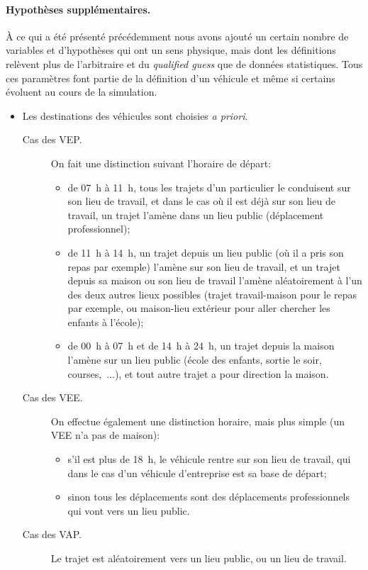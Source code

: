 		\paragraph{Hypothèses supplémentaires.} À ce qui a été présenté précédemment nous avons ajouté un certain nombre de variables et d'hypothèses qui ont un sens physique, mais dont les définitions relèvent plus de l'arbitraire et du \emph{qualified guess} que de données statistiques. Tous ces paramètres font partie de la définition d'un véhicule et même si certains évoluent au cours de la simulation.
		\begin{itemize}
			\item Les destinations des véhicules sont choisies \emph{a priori}. 
				\begin{description}
					\item[Cas des VEP.] On fait une distinction suivant l'horaire de départ:
					\begin{itemize}
    						\item de 07~h à 11~h, tous les trajets d'un particulier le conduisent sur son lieu de travail, et dans le cas où il est déjà sur son lieu de travail, un trajet l'amène dans un lieu public (déplacement professionnel);
    						\item de 11~h à 14~h, un trajet depuis un lieu public (où il a pris son repas par exemple) l'amène sur son lieu de travail, et un trajet depuis sa maison ou son lieu de travail l'amène aléatoirement à l'un des deux autres lieux possibles (trajet travail-maison pour le repas par exemple, ou maison-lieu extérieur pour aller chercher les enfants à l'école);
    						\item de 00~h à 07~h et de 14~h à 24~h, un trajet depuis la maison l'amène sur un lieu public (école des enfants, sortie le soir, courses,~...), et tout autre trajet a pour direction la maison.
    					\end{itemize}
					\item[Cas des VEE.] On effectue également une distinction horaire, mais plus simple (un VEE n'a pas de \og{}maison\fg{}):
    					\begin{itemize}
    						\item s'il est plus de 18~h, le véhicule rentre sur son lieu de travail, qui dans le cas d'un véhicule d'entreprise est sa base de départ;
    						\item sinon tous les déplacements sont des déplacements professionnels qui vont vers un lieu public.
    					\end{itemize}
					\item[Cas des VAP.] Le trajet est aléatoirement vers un lieu public, ou un lieu de travail.

\end{description}
\end{itemize}
